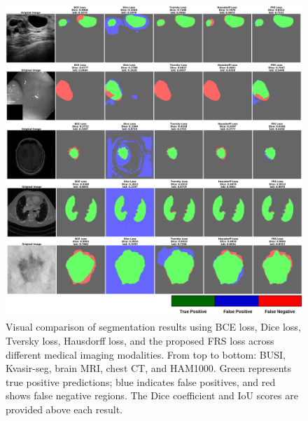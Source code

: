 \documentclass[review]{elsarticle}
\begin{document}
\begin{figure}[H]
    \centering
    \includegraphics[scale=0.5]{SampleBaseline.png}
    \caption{Visual comparison of segmentation results using BCE loss, Dice loss, Tversky loss, Hausdorff loss, and the proposed FRS loss across different medical imaging modalities. From top to bottom: BUSI, Kvasir-seg, brain MRI, chest CT, and HAM1000. Green represents true positive predictions; blue indicates false positives, and red shows false negative regions. The Dice coefficient and IoU scores are provided above each result. }
    \label{fig:sample_baseline}
\end{figure}
\end{document}

